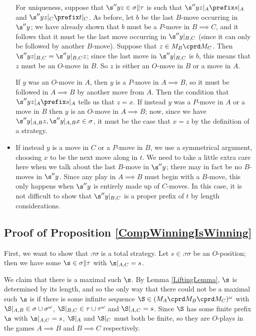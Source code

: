\documentclass[11pt]{article} %
\begin{document}
\begin{itemize}
    For uniqueness, suppose that $\s''yz\in\sigma\|\tau$ is such that $\s''yz\vert_A\prefix s\vert_A$ and $\s''yz\vert_C\prefix t\vert_C$.  As before, let $b$ be the last $B$-move occurring in $\s''y$; we have already shown that $b$ must be a $P$-move in $B\implies C$, and it follows that it must be the last move occurring in $\s''y\vert_{B,C}$ (since it can only be followed by another $B$-move).  Suppose that $z\in M_B\cprd M_C$.  Then $\s''yz\vert_{B,C}=\s''y\vert_{B,C}z$; since the last move in $\s''y\vert_{B,C}$ is $b$, this means that $z$ must be an $O$-move in $B$.  So $z$ is either an $O$-move in $B$ or a move in $A$.

    If $y$ was an $O$-move in $A$, then $y$ is a $P$-move in $A\implies B$, so it must be followed in $A\implies B$ by another move from $A$.  Then the condition that $\s''yz\vert_A\prefix s\vert_A$ tells us that $z=x$.  If instead $y$ was a $P$-move in $A$ or a move in $B$ then $y$ is an $O$-move in $A\implies B$; now, since we have $\s''y\vert_{A,B}z,\s''y\vert_{A,B}x\in\sigma$, it must be the case that $x=z$ by the definition of a strategy.

  \item If instead $y$ is a move in $C$ or a $P$-move in $B$, we use a symmetrical argument, choosing $x$ to be the next move along in $t$.  We need to take a little extra care here when we talk about the last $B$-move in $\s''y$; there may in fact be no $B$-moves in $\s''y$.  Since any play in $A\implies B$ must begin with a $B$-move, this only happens when $\s''y$ is entirely made up of $C$-moves.  In this case, it is not difficult to show that $\s''y\vert_{B,C}$ is a proper prefix of $t$ by length considerations.  \qedhere
\end{itemize}

\subsection{Proof of Proposition \ref{CompWinningIsWinning}}
\label{CompWinningIsWinningProof}

First, we want to show that $\comp\tau\sigma$ is a total strategy.  Let $s\in\comp\tau\sigma$ be an $O$-position; then we have some $\s\in\sigma\|\tau$ with $\s\vert_{A,C}=s$.  

We claim that there is a maximal such $\s$.  By Lemma \ref{LiftingLemma}, $\s$ is determined by its length, and so the only way that there could not be a maximal such $\s$ is if there is some infinite sequence $\S\in(M_A\cprd M_B\cprd M_C)^\omega$ with $\S\vert_{A,B}\in\sigma\cup\sigma^\omega$, $\S\vert_{B,C}\in\tau\cup\tau^\omega$ and $\S\vert_{A,C}=s$.  Since $\S$ has some finite prefix $\s$ with $\s\vert_{A,C}=s$, $\S\vert_A$ and $\S\vert_C$ must both be finite, so they are $O$-plays in the games $A\implies B$ and $B\implies C$ respectively.  
\end{document}
